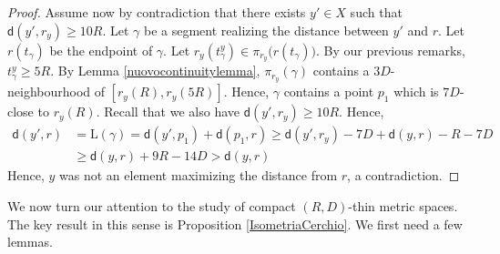 \documentclass[10pt]{article}
\theoremstyle{definition}
\newcommand{\length}{\mathrm{L}}
\newcommand{\sd}{\mathsf{d}}
\begin{document}
\begin{proof}
           Assume now by contradiction that there exists $y' \in X$ such that $\sd(y',r_y) \geq 10R$. Let $\gamma$ be a segment realizing the distance between $y'$ and $r$. Let $r(t_\gamma)$ be the endpoint of $\gamma$. Let $r_y(t_\gamma^y) \in \pi_{r_y}\big(r(t_\gamma) \big)$. By our previous remarks, $t_\gamma^y \geq 5R$. By Lemma \ref{nuovocontinuitylemma}, $\pi_{r_y}(\gamma)$ contains a $3D$-neighbourhood of $[r_y(R),r_y(5R)]$. Hence, $\gamma$ contains a point $p_1$ which is $7D$-close to $r_y(R)$. Recall that we also have $\sd(y',r_y) \geq 10R$. Hence, 
           \begin{align*}
           \sd(y',r)&=\length(\gamma) = \sd(y',p_1)+\sd(p_1,r) 
           \geq \sd(y',r_y)-7D+\sd(y,r)-R-7D \\ 
           & \geq \sd(y,r)+9R-14D>\sd(y,r)
           \end{align*}
           Hence, $y$ was not an element maximizing the distance from $r$, a contradiction.
        \end{proof}

We now turn our attention to the study of compact $(R,D)$-thin metric spaces. The key result in this sense is Proposition \ref{IsometriaCerchio}. We first need a few lemmas.
\end{document}
